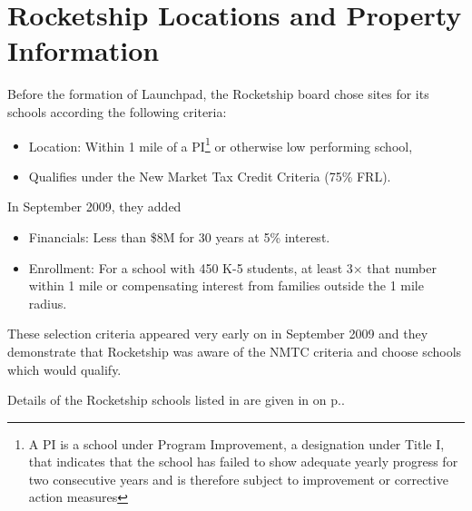 \section{Rocketship Locations and Property Information}
\label{sec:location-and-property-info}\indent%

Before the formation of Launchpad, the Rocketship board chose sites for its schools according the following criteria:
\begin{itemize}
  \item Location: Within 1 mile of a PI\footnote{A PI is a school under Program Improvement, a designation under Title I, that indicates that the school has failed to show adequate yearly progress for two consecutive years and is therefore subject to improvement or corrective action measures} or otherwise low performing school, 
  \item Qualifies under the New Market Tax Credit Criteria (75\% FRL).
\end{itemize}
In September 2009, they added
\begin{itemize}
  \item Financials: Less than \$8M for 30 years at 5\% interest.
  \item Enrollment: For a school with 450 K-5 students, at least 3× that number within 1 mile or compensating interest from families outside the 1 mile radius.
\end{itemize}
These selection criteria appeared very early on in September 2009\parencite{RSED2009b} and they demonstrate that Rocketship was aware of the NMTC criteria and choose schools which would qualify.

Details of the Rocketship schools listed in  are given in  on
p.\pageref{appx:rocketship-property-info}.

